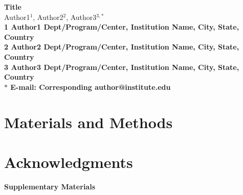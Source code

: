 \documentclass[10pt]{article}
\date{}
\begin{document}
\begin{flushleft}
{\Large
\textbf{Title}
}
\\
Author1$^{1}$, 
Author2$^{2}$, 
Author3$^{3,\ast}$
\\
\bf{1} Author1 Dept/Program/Center, Institution Name, City, State, Country
\\
\bf{2} Author2 Dept/Program/Center, Institution Name, City, State, Country
\\
\bf{3} Author3 Dept/Program/Center, Institution Name, City, State, Country
\\
$\ast$ E-mail: Corresponding author@institute.edu
\end{flushleft}








\section*{Materials and Methods}

\section*{Acknowledgments}


%



\clearpage
\begin{center}
{\bf \Huge Supplementary Materials}
\end{center}




\end{document}
